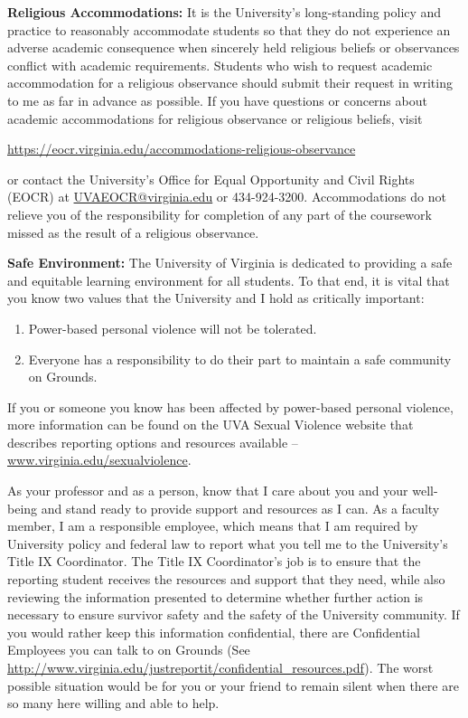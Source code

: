 \documentclass[12pt]{article}
\begin{document}
\textbf{Religious Accommodations:} It is the University's long-standing policy and practice to reasonably accommodate students so that they do not experience an adverse academic consequence when sincerely held religious beliefs or observances conflict with academic requirements.  Students who wish to request academic accommodation for a religious observance should submit their request in writing to me as far in advance as possible. If you have questions or concerns about academic accommodations for religious observance or religious beliefs, visit 

\begin{center} 
    \url{https://eocr.virginia.edu/accommodations-religious-observance}
\end{center}

or contact the University's Office for Equal Opportunity and Civil Rights (EOCR) at \url{UVAEOCR@virginia.edu} or 434-924-3200.  Accommodations do not relieve you of the responsibility for completion of any part of the coursework missed as the result of a religious observance.

\textbf{Safe Environment:} The University of Virginia is dedicated to providing a safe and equitable learning environment for all students. To that end, it is vital that you know two values that the University and I hold as critically important:
 
\begin{enumerate}
    \item Power-based personal violence will not be tolerated. 
    \item Everyone has a responsibility to do their part to maintain a safe community on Grounds.
\end{enumerate}

If you or someone you know has been affected by power-based personal violence, more information can be found on the UVA Sexual Violence website that describes reporting options and resources available -- \url{www.virginia.edu/sexualviolence}. 
   
As your professor and as a person, know that I care about you and your well-being and stand ready to provide support and resources as I can. As a faculty member, I am a responsible employee, which means that I am required by University policy and federal law to report what you tell me to the University's Title IX Coordinator. The Title IX Coordinator's job is to ensure that the reporting student receives the resources and support that they need, while also reviewing the information presented to determine whether further action is necessary to ensure survivor safety and the safety of the University community. If you would rather keep this information confidential, there are Confidential Employees you can talk to on Grounds (See \url{http://www.virginia.edu/justreportit/confidential\_resources.pdf}). The worst possible situation would be for you or your friend to remain silent when there are so many here willing and able to help.
\end{document}
